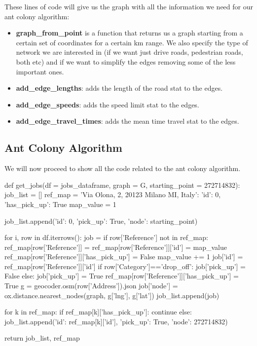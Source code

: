 \documentclass[titlepage]{article}
\begin{document}
These lines of code will give us the graph with all the information we need for our ant colony algorithm:
\begin{itemize}
    \item \textbf{graph\_from\_point} is a function that returns us a graph starting from a certain set of coordinates for a certain km range. We also specify the type of network we are interested in (if we want just drive roads, pedestrian roads, both etc) and if we want to simplify the edges removing some of the less important ones.
    \item \textbf{add\_edge\_lengths}: adds the length of the road stat to the edges.
    \item \textbf{add\_edge\_speeds}: adds the speed limit stat to the edges.
    \item \textbf{add\_edge\_travel\_times}: adds the mean time travel stat to the edges.
\end{itemize}

\subsection{Ant Colony Algorithm}
We will now proceed to show all the code related to the ant colony algorithm.

\begin{python}
def get_jobs(df = jobs_dataframe, graph = G, starting_point = 272714832):
    job_list = []
    ref_map = {'Via Olona, 2, 20123 Milano MI, Italy': {'id': 0, 'has_pick_up': True}}
    map_value = 1

    job_list.append({'id': 0, 'pick_up': True, 'node': starting_point})
    
    for i, row in df.iterrows():
        job = {}
        if row['Reference'] not in ref_map:
            ref_map[row['Reference']] = {}
            ref_map[row['Reference']]['id'] = map_value
            ref_map[row['Reference']]['has_pick_up'] = False
            map_value += 1
        job['id'] = ref_map[row['Reference']]['id']
        if row['Category']=='drop_off':
            job['pick_up'] = False
        else:
            job['pick_up'] = True
            ref_map[row['Reference']]['has_pick_up'] = True
        g = geocoder.osm(row['Address']).json
        job['node'] = ox.distance.nearest_nodes(graph, g['lng'], g['lat'])
        job_list.append(job)

    for k in ref_map:
        if ref_map[k]['has_pick_up']:
            continue
        else:
            job_list.append({'id': ref_map[k]['id'], 'pick_up': True, 'node': 272714832})

    return job_list, ref_map
\end{python}
\end{document}
